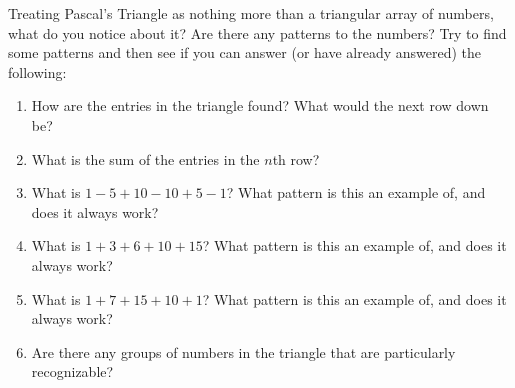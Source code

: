 \documentclass{book}
\begin{document}
\setcounter{project}{63}
\addtocounter{project}{-1}
\begin{activity}[]\label{activity-56}
\hypertarget{p-501}{}%
Treating Pascal's Triangle as nothing more than a triangular array of numbers, what do you notice about it?  Are there any patterns to the numbers? Try to find some patterns and then see if you can answer (or have already answered) the following:%
\begin{enumerate}[font=\bfseries,label=(\alph*),ref=\alph*]
\item\label{task-73} \hypertarget{p-502}{}%
How are the entries in the triangle found?  What would the next row down be?%
\item\label{task-74} \hypertarget{p-503}{}%
What is the sum of the entries in the \(n\)th row?%
\item\label{task-75} \hypertarget{p-504}{}%
What is \(1 - 5 + 10 - 10 + 5 - 1\)?  What pattern is this an example of, and does it always work?%
\item\label{task-76} \hypertarget{p-505}{}%
What is \(1 + 3 + 6 + 10 + 15\)?  What pattern is this an example of, and does it always work?%
\item\label{task-77} \hypertarget{p-506}{}%
What is \(1+ 7 + 15 + 10 + 1\)?  What pattern is this an example of, and does it always work?%
\item\label{task-78} \hypertarget{p-507}{}%
Are there any groups of numbers in the triangle that are particularly recognizable?%
\end{enumerate}
\end{activity}
\end{document}
